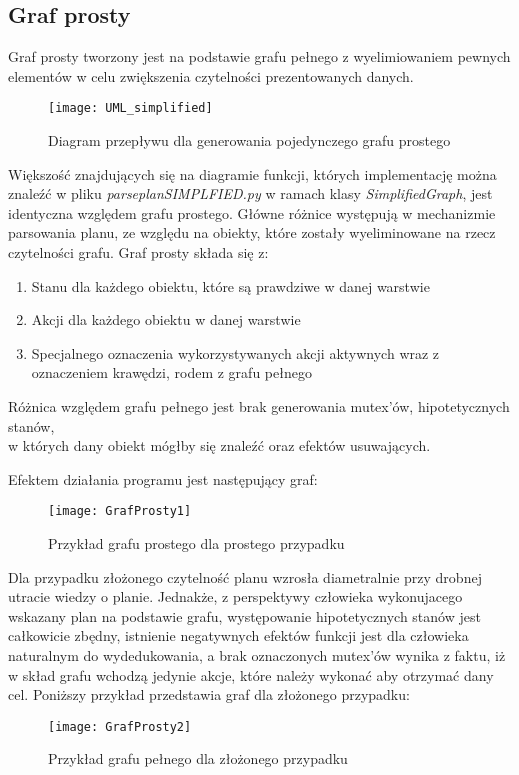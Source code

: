     \subsection{Graf prosty}

    Graf prosty tworzony jest na podstawie grafu pełnego z wyelimiowaniem pewnych elementów w celu zwiększenia czytelności prezentowanych danych.
    \begin{figure}
        \texttt{[image: UML\_simplified]}
        \centering
        \caption{Diagram przepływu dla generowania pojedynczego grafu prostego}
    \end{figure}
    Większość znajdujących się na diagramie funkcji, których implementację można znaleźć w pliku \textit{parseplanSIMPLFIED.py} w ramach klasy 
    \textit{SimplifiedGraph}, jest identyczna względem grafu prostego. Główne różnice występują w mechanizmie parsowania planu, ze względu na obiekty, 
    które zostały wyeliminowane na rzecz czytelności grafu. Graf prosty składa się z:
    \begin{enumerate}
        \item Stanu dla każdego obiektu, które są prawdziwe w danej warstwie
        \item Akcji dla każdego obiektu w danej warstwie
        \item Specjalnego oznaczenia wykorzystywanych akcji aktywnych wraz z oznaczeniem krawędzi, rodem z grafu pełnego
    \end{enumerate}
    Różnica względem grafu pełnego jest brak generowania mutex'ów, hipotetycznych stanów, \\
    w których dany obiekt mógłby się znaleźć oraz efektów usuwających.
    
    Efektem działania programu jest następujący graf:
    \begin{figure}[H]
        \texttt{[image: GrafProsty1]}
        \centering
        \caption{Przykład grafu prostego dla prostego przypadku}
    \end{figure}
    Dla przypadku złożonego czytelność planu wzrosła diametralnie przy drobnej utracie wiedzy o planie. Jednakże, z perspektywy człowieka wykonujacego 
    wskazany plan na podstawie grafu, występowanie hipotetycznych stanów jest całkowicie zbędny, istnienie negatywnych efektów funkcji jest dla 
    człowieka naturalnym do wydedukowania, a brak oznaczonych mutex'ów wynika z faktu, iż w skład grafu wchodzą jedynie akcje, 
    które należy wykonać aby otrzymać dany cel. Poniższy przykład przedstawia graf dla złożonego przypadku:
    \begin{figure}[H]
        \texttt{[image: GrafProsty2]}
        \centering
        \caption{Przykład grafu pełnego dla złożonego przypadku}
    \end{figure}

